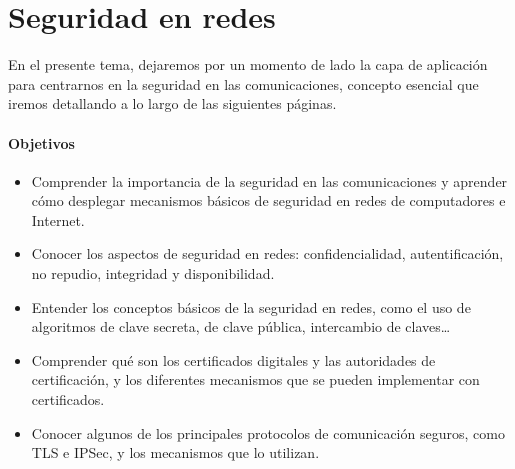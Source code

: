 \chapter{Seguridad en redes}

En el presente tema, dejaremos por un momento de lado la capa de aplicación para centrarnos en la seguridad en las comunicaciones, concepto esencial que iremos detallando a lo largo de las siguientes páginas.

\subsubsection{Objetivos}
\begin{itemize}
    \item Comprender la importancia de la seguridad en las comunicaciones y aprender cómo desplegar mecanismos básicos de seguridad en redes de computadores e Internet.
    \item Conocer los aspectos de seguridad en redes: confidencialidad, autentificación, no repudio, integridad y disponibilidad. 
    \item Entender los conceptos básicos de la seguridad en redes, como el uso de algoritmos de clave secreta, de clave pública, intercambio de claves\ldots
    \item Comprender qué son los certificados digitales y las autoridades de certificación, y los diferentes mecanismos que se pueden implementar con certificados. 
    \item Conocer algunos de los principales protocolos de comunicación seguros, como \acrshort{TLS} e \acrshort{IPSec}, y los mecanismos que lo utilizan. 
\end{itemize}


